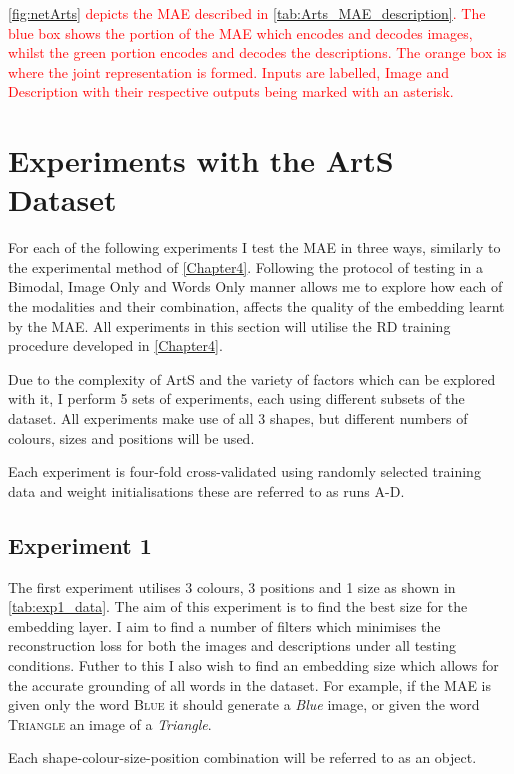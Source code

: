 \textcolor{red}{\autoref{fig:netArts} depicts the \ac{MAE} described in \autoref{tab:Arts_MAE_description}. The blue box shows the portion of the \ac{MAE} which encodes and decodes images, whilst the green portion encodes and decodes the descriptions. The orange box is where the joint representation is formed. Inputs are labelled, Image and Description with their respective outputs being marked with an asterisk.}
	


\section{Experiments with the ArtS Dataset}
For each of the following experiments I test the \ac{MAE} in three ways, similarly to the experimental method of \autoref{Chapter4}. Following the protocol of testing in a Bimodal, Image Only and Words Only manner allows me to explore how each of the modalities and their combination, affects the quality of the embedding learnt by the \ac{MAE}. All experiments in this section will utilise the RD training procedure developed in \autoref{Chapter4}.


Due to the complexity of ArtS and the variety of factors which can be explored with it, I perform 5 sets of experiments, each using different subsets of the dataset. All experiments make use of all 3 shapes, but different numbers of colours, sizes and positions will be used.

Each experiment is four-fold cross-validated using randomly selected training data and weight initialisations these are referred to as runs A-D.

\subsection{Experiment 1}
The first experiment utilises 3 colours, 3 positions and 1 size as shown in \autoref{tab:exp1_data}. The aim of this experiment is to find the best size for the embedding layer. I aim to find a number of filters which minimises the reconstruction loss for both the images and descriptions under all testing conditions. Futher to this I also wish to find an embedding size which allows for the accurate grounding of all words in the dataset. For example, if the \ac{MAE} is given only the word \textsc{Blue} it should generate a \textit{Blue} image, or given the word \textsc{Triangle} an image of a \textit{Triangle}. 

Each shape-colour-size-position combination will be referred to as an object.

